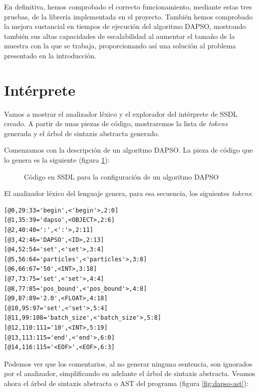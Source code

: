 \vspace{10pt}
En definitiva, hemos comprobado el correcto funcionamiento, mediante estas tres pruebas, de la librería implementada en el
proyecto. También hemos comprobado la mejora sustancial en tiempos de ejecución del algoritmo DAPSO, mostrando también sus
altas capacidades de escalabilidad al aumentar el tamaño de la muestra con la que se trabaja, proporcionando así una 
solución al problema presentado en la introducción.

\section{Intérprete}

Vamos a mostrar el analizador léxico y el explorador del intérprete de SSDL creado. A partir de unas piezas de código,
mostraremos la lista de \textit{tokens} generada y el árbol de sintaxis abstracta generado.

\vspace{10pt}
Comenzamos con la descripción de un algoritmo DAPSO. La pieza de código que lo genera es la siguiente
(figura \ref{fig:dapso-ssdl}):

\begin{figure}[ht!]
    \centering
    
    \caption{Código en SSDL para la configuración de un algoritmo DAPSO}
    \label{fig:dapso-ssdl}
\end{figure}

El analizador léxico del lenguaje genera, para esa secuencia, los siguientes \textit{tokens}:
\vspace{10pt}
\begin{lstlisting}[numbers=none]
[@0,29:33='begin',<'begin'>,2:0]
[@1,35:39='dapso',<OBJECT>,2:6]
[@2,40:40=':',<':'>,2:11]
[@3,42:46='DAPSO',<ID>,2:13]
[@4,52:54='set',<'set'>,3:4]
[@5,56:64='particles',<'particles'>,3:8]
[@6,66:67='50',<INT>,3:18]
[@7,73:75='set',<'set'>,4:4]
[@8,77:85='pos_bound',<'pos_bound'>,4:8]
[@9,87:89='2.0',<FLOAT>,4:18]
[@10,95:97='set',<'set'>,5:4]
[@11,99:108='batch_size',<'batch_size'>,5:8]
[@12,110:111='10',<INT>,5:19]
[@13,113:115='end',<'end'>,6:0]
[@14,116:115='<EOF>',<EOF>,6:3]
\end{lstlisting}

Podemos ver que los comentarios, al no generar ninguna sentencia, son ignorados por el analizador, simplificando 
en adelante el árbol de sintaxis abstracta. Veamos ahora el árbol de sintaxis abstracta o AST del programa (figura 
\ref{fig:dapso-ast}):

